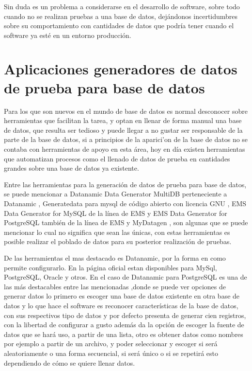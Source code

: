 Sin duda es un problema a considerarse en el desarrollo de software, sobre todo cuando no se realizan pruebas a una base de datos, dej\'andonos incertidumbres sobre su comportamiento con cantidades de datos que podr\'ia tener cuando el software ya est\'e en un entorno producci\'on.
\section{Aplicaciones generadores de datos de prueba para base de datos}
Para los que son nuevos en el mundo de base de datos es normal desconocer sobre herramientas que facilitan la tarea, y optan en llenar de forma manual una base de datos, que resulta ser tedioso y puede llegar a no gustar ser responsable de la parte de la base de datos, si a principios de la aparici'on de la base de datos no se contaba con herramientas de apoyo en esta \'area, hoy en d\'ia existen herramientas que automatizan procesos como el llenado de datos de prueba en cantidades grandes sobre una base de datos ya existente. 

Entre las herramientas para la generaci\'on de datos de prueba para base de datos, se puede mencionar a Datanamic Data Generator MultiDB perteneciente a Datanamic \cite{datanamic}, Generatedata para mysql de c\'odigo abierto con licencia GNU \cite{generatedata}, EMS Data Generator for MySQL de la l\'inea de EMS y EMS Data Generator for PostgreSQL tambi\'en de la l\'inea de EMS \cite{emsdatagenerator} y MyDatagen \cite{mydatagen}, son algunas que se puede mencionar lo cual no significa que sean las \'unicas, con estas herramientas es posible realizar el poblado de datos para su posterior realizaci\'on de pruebas.

De las herramientas el mas destacado es Datanamic, por la forma en como permite configurarlo. En la p\'agina oficial \cite{datanamic} estan disponibles para MySql, PostgreSQL, Oracle y otros. En el caso de Datanamic para PostgreSQL es una de las  m\'as destacables entre las mencionadas ,donde se puede ver opciones de generar datos lo primero es escoger una base de datos existente en otra base de datos y lo que hace el software es reconocer caracter\'isticas de la base de datos, con sus respectivos tipo de datos y por defecto presenta de generar cien registros, con la libertad de configurar a gusto adem\'as da la opci\'on de escoger la fuente de datos que se har\'a uso, a partir de una lista, otro es obtener datos como nombres por ejemplo a partir de un archivo, y poder seleccionar y escoger si ser\'a aleatoriamente o una forma secuencial, si ser\'a \'unico o si se repetir\'a esto dependiendo de c\'omo se quiere llenar datos.

